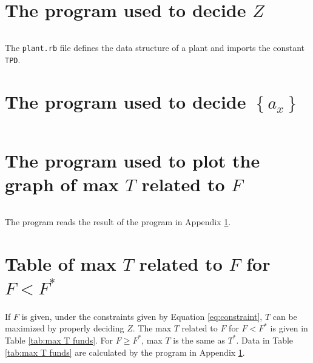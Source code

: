 \documentclass{article}
\begin{document}
\begin{appendices}

\section{The program used to decide $Z$}
\label{appendix:prog min T}

\inputminted{ruby}{../knappack.rb}

The \texttt{plant.rb} file defines the data structure of a plant and imports the constant \texttt{TPD}.

\section{The program used to decide $\left\{a_x\right\}$}
\label{appendix:decide start time}

\inputminted{ruby}{../min_variance.rb}

\section{The program used to plot the graph of max $T$ related to $F$}

\inputminted{python}{../plot.py}

The program reads the result of the program in Appendix \ref{appendix:prog min T}.

\section{Table of max $T$ related to $F$ for $F<F^*$}

If $F$ is given, under the constraints given by Equation \ref{eq:constraint}, $T$ can be maximized by properly deciding $Z$.
The max $T$ related to $F$ for $F<F^*$ is given in Table \ref{tab:max T funds}.
For $F\ge F^*$, max $T$ is the same as $T^*$.
Data in Table \ref{tab:max T funds} are calculated by the program in Appendix \ref{appendix:prog min T}.


\end{appendices}
\end{document}
